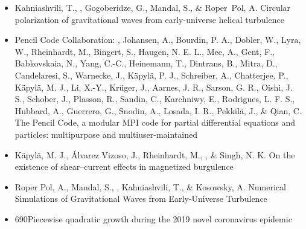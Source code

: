 \begin{itemize}
\item[{413.}~]
Kahniashvili, T., \Brandenburg, Gogoberidze, G., Mandal, S., \& Roper~Pol, A.
{Circular polarization of gravitational waves from early-universe helical turbulence}

\item[{412.}~]
Pencil Code Collaboration: \Brandenburg, Johansen, A., Bourdin, P. A., Dobler, W., Lyra, W., Rheinhardt, M., Bingert, S., Haugen, N. E. L., Mee, A., Gent, F., Babkovskaia, N., Yang, C.-C., Heinemann, T., Dintrans, B., Mitra, D., Candelaresi, S., Warnecke, J., K\"apyl\"a, P. J., Schreiber, A., Chatterjee, P., K\"apyl\"a, M. J., Li, X.-Y., Kr\"uger, J., Aarnes, J. R., Sarson, G. R., Oishi, J. S., Schober, J., Plasson, R., Sandin, C., Karchniwy, E., Rodrigues, L. F. S., Hubbard, A., Guerrero, G., Snodin, A., Losada, I. R., Pekkil\"a, J., \& Qian, C.
{The Pencil Code, a modular MPI code for partial differential equations and particles: multipurpose and multiuser-maintained}

\item[{411.}~]
K\"apyl\"a, M. J., \'Alvarez Vizoso, J., Rheinhardt, M., \Brandenburg, \& Singh, N. K.
{On the existence of shear--current effects in magnetized burgulence}

\item[{410.}~]
Roper Pol, A., Mandal, S., \Brandenburg, Kahniashvili, T., \& Kosowsky, A.
{Numerical Simulations of Gravitational Waves from Early-Universe Turbulence}

\item[{409.}~]
\Brandenburg{}
{690}{Piecewise quadratic growth during the 2019 novel coronavirus epidemic}


\end{itemize}
